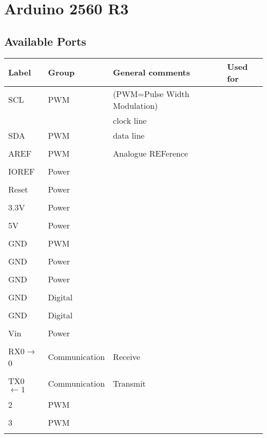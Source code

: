 \documentclass{article}
\begin{document}
  
\section{Arduino 2560 R3}

\subsection{Available Ports}

 \begin{longtable}{|l|l|l|l|}
 \hline
Label&Group&General comments  & Used for  \hspace{4cm} \\ \hline
SCL&PWM&(PWM=Pulse Width Modulation)&\\ &&clock line&\\ \hline
SDA&PWM&data line&\\ &&&\\\hline
AREF&PWM& Analogue REFerence&\\&&&\\ \hline
IOREF&Power&&\\&&&\\ \hline
Reset&Power&&\\ &&&\\\hline
3.3V&Power&&\\&&&\\ \hline
5V&Power&&\\ &&&\\\hline
GND&PWM&&\\&&&\\ \hline
GND&Power&&\\&&&\\ \hline
GND&Power&&\\&&&\\\hline
GND&Digital&&\\&&&\\ \hline
GND&Digital&&\\ &&&\\\hline
Vin&Power&&\\ &&&\\ \hline
RX0$\rightarrow$0&Communication&Receive&\\ &&&\\\hline
TX0$\leftarrow1$&Communication&Transmit&\\ &&&\\\hline
2&PWM&&\\&&&\\ \hline
3&PWM&&\\&&&\\ \hline

\end{longtable}
\end{document}

